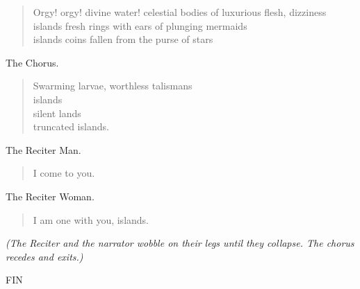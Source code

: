 \documentclass[letterpaper,article,12pt,oneside,notitlepage]{memoir}
\begin{document}
\begin{verse}
Orgy! orgy! divine water! celestial bodies of luxurious flesh, dizziness \\
islands fresh rings with ears of plunging mermaids \\
islands coins fallen from the purse of stars \\
\end{verse}

\begin{center}The Chorus.\end{center}

\begin{verse}
Swarming larvae, worthless talismans \\
islands \\
silent lands \\
truncated islands. \\
\end{verse}

\begin{center}The Reciter Man.\end{center}

\begin{verse}
I come to you. \\
\end{verse}

\begin{center}The Reciter Woman.\end{center}

\begin{verse}
I am one with you, islands. \\
\end{verse}

\textit{(The Reciter and the narrator wobble on their legs until they collapse. The chorus recedes and exits.)}

\begin{center}FIN\end{center}
\vspace{1cm}
\end{document}
